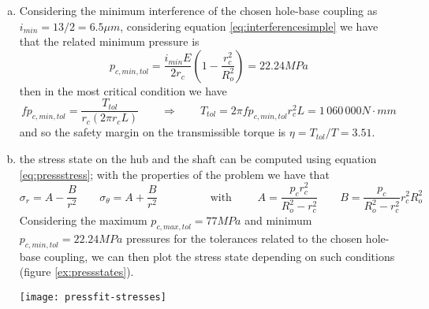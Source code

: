 \begin{enumerate}[a)]
	\item Considering the minimum interference of the chosen hole-base coupling as $i_{min} = 13/2 = 6.5 \mu m$, considering equation \ref{eq:interferencesimple} we have that the related minimum pressure is
	\[ p_{c,min,tol} = \frac{i_{min}E}{ 2 r_c} \left( 1 - \frac{r_c^2}{R_o^2}\right) = 22.24 MPa  \]
	then in the most critical condition we have
	\[ f p_{c,min,tol} = \frac{T_{tol}}{r_c (2\pi r_c L)} \qquad \Rightarrow \qquad T_{tol} = 2\pi fp_{c,min,tol}r_c^2 L = 1\,060\,000 N\cdot mm \]
	and so the safety margin on the transmissible torque is $\eta = T_{tol} / T = 3.51$.
	
	\item the stress state on the hub and the shaft can be computed using equation \ref{eq:pressstress}; with the properties of the problem we have that
	\[ \sigma_r = A - \frac B {r^2} \qquad \sigma_\theta = A + \frac B {r^2} \hspace{2cm} \textrm{with } \qquad A = \frac{p_c r_c^2}{R_o^2-r_c^2} \qquad B = \frac{p_c}{R_o^2-r_c^2} r_c^2R_o^2 \]
	Considering the maximum $p_{c,max,tol} = 77MPa $ and minimum $p_{c,min,tol} = 22.24MPa$ pressures for the tolerances related to the chosen hole-base coupling, we can then plot the stress state depending on such conditions (figure \ref{ex:pressstates}).
	\begin{SCfigure}[1][bht]
		\centering \texttt{[image: pressfit-stresses]}
		\caption{stress states in the shaft and the gear due to press fit connection in case of minimum and maximum tolerance coupling.} \label{ex:pressstates}
	\end{SCfigure}
	
	
	
	
	
	
	
	
	
	
	
	
	
	
\end{enumerate}